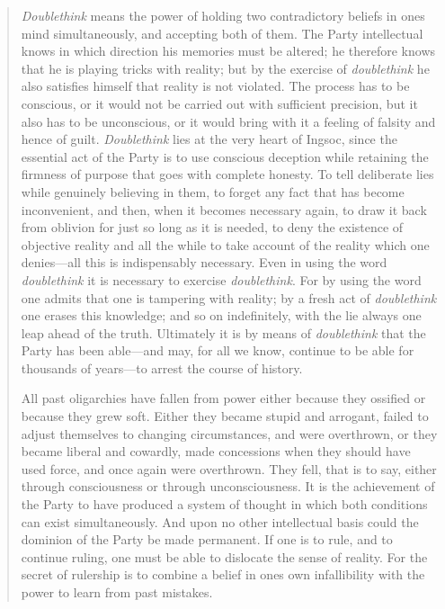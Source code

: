 \begin{quotation}
\emph{Doublethink} means the power of holding two contradictory beliefs
in one\textquotesingle s mind simultaneously, and accepting both of
them. The Party intellectual knows in which direction his memories must
be altered; he therefore knows that he is playing tricks with reality;
but by the exercise of \emph{doublethink} he also satisfies himself that
reality is not violated. The process has to be conscious, or it would
not be carried out with sufficient precision, but it also has to be
unconscious, or it would bring with it a feeling of falsity and hence of
guilt. \emph{Doublethink} lies at the very heart of Ingsoc, since the
essential act of the Party is to use conscious deception while retaining
the firmness of purpose that goes with complete honesty. To tell
deliberate lies while genuinely believing in them, to forget any fact
that has become inconvenient, and then, when it becomes necessary again,
to draw it back from oblivion for just so long as it is needed, to deny
the existence of objective reality and all the while to take account of
the reality which one denies---all this is indispensably necessary. Even
in using the word \emph{doublethink} it is necessary to exercise
\emph{doublethink}. For by using the word one admits that one is
tampering with reality; by a fresh act of \emph{doublethink} one erases
this knowledge; and so on indefinitely, with the lie always one leap
ahead of the truth. Ultimately it is by means of \emph{doublethink} that
the Party has been able---and may, for all we know, continue to be able
for thousands of years---to arrest the course of history.

All past oligarchies have fallen from power either because they ossified
or because they grew soft. Either they became stupid and arrogant,
failed to adjust themselves to changing circumstances, and were
overthrown, or they became liberal and cowardly, made concessions when
they should have used force, and once again were overthrown. They fell,
that is to say, either through consciousness or through unconsciousness.
It is the achievement of the Party to have produced a system of thought
in which both conditions can exist simultaneously. And upon no other
intellectual basis could the dominion of the Party be made permanent. If
one is to rule, and to continue ruling, one must be able to dislocate
the sense of reality. For the secret of rulership is to combine a belief
in one\textquotesingle s own infallibility with the power to learn from
past mistakes.


\end{quotation}
